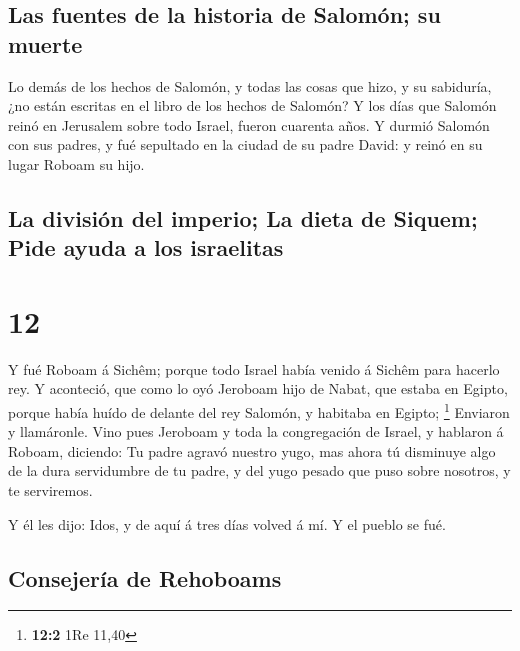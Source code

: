 \hypertarget{las-fuentes-de-la-historia-de-salomuxf3n-su-muerte}{%
\subsection{Las fuentes de la historia de Salomón; su
muerte}\label{las-fuentes-de-la-historia-de-salomuxf3n-su-muerte}}

 Lo demás de los hechos de Salomón, y todas las cosas que
hizo, y su sabiduría, ¿no están escritas en el libro de los hechos de
Salomón?  Y los días que Salomón reinó en Jerusalem sobre
todo Israel, fueron cuarenta años.  Y durmió Salomón con
sus padres, y fué sepultado en la ciudad de su padre David: y reinó en
su lugar Roboam su hijo.

\hypertarget{la-divisiuxf3n-del-imperio-la-dieta-de-siquem-pide-ayuda-a-los-israelitas}{%
\subsection{La división del imperio; La dieta de Siquem; Pide ayuda a
los
israelitas}\label{la-divisiuxf3n-del-imperio-la-dieta-de-siquem-pide-ayuda-a-los-israelitas}}

\hypertarget{section-11}{%
\section{12}\label{section-11}}

 Y fué Roboam á Sichêm; porque todo Israel había venido á
Sichêm para hacerlo rey.  Y aconteció, que como lo oyó
Jeroboam hijo de Nabat, que estaba en Egipto, porque había huído de
delante del rey Salomón, y habitaba en Egipto; \footnote{\textbf{12:2}
  1Re 11,40}  Enviaron y llamáronle. Vino pues Jeroboam y
toda la congregación de Israel, y hablaron á Roboam, diciendo:
 Tu padre agravó nuestro yugo, mas ahora tú disminuye algo
de la dura servidumbre de tu padre, y del yugo pesado que puso sobre
nosotros, y te serviremos.

 Y él les dijo: Idos, y de aquí á tres días volved á mí. Y
el pueblo se fué.

\hypertarget{consejeruxeda-de-rehoboams}{%
\subsection{Consejería de Rehoboams}\label{consejeruxeda-de-rehoboams}}

